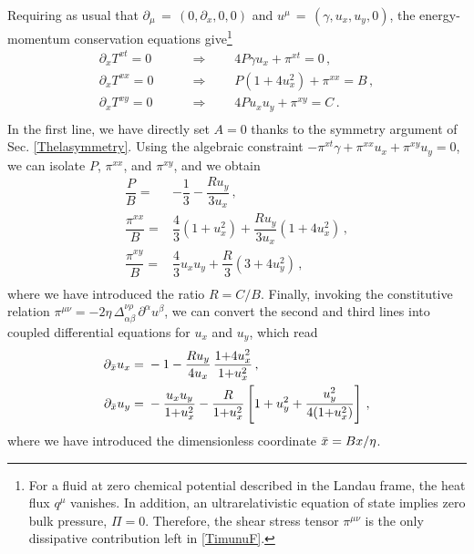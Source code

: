 \documentclass[a4paper, amsfonts, amssymb, amsmath, reprint, showkeys, nofootinbib, twoside,notitlepage,onecolumn]{revtex4-1}
\theoremstyle{definition}
\theoremstyle{theorem}
\begin{document}
Requiring as usual that $\partial_\mu\,{=}\,(0,\partial_x,0,0)$ and  $u^\mu\,{=}\,(\gamma,u_x,u_y,0)$, the energy-momentum conservation equations give\footnote{For a fluid at zero chemical potential described in the Landau frame, the heat flux $q^\mu$ vanishes. In addition, an ultrarelativistic equation of state implies zero bulk pressure, $\Pi=0$. Therefore, the shear stress tensor $\pi^{\mu\nu}$ is the only dissipative contribution left in \eqref{TimunuF}.}
\begin{equation}\label{ABCZeroChem}
\begin{split}
\partial_x T^{xt}=0 & \qquad \Longrightarrow \qquad 4P\gamma u_x +\pi^{xt}=0 \, , \\
\partial_x T^{xx}=0 & \qquad \Longrightarrow  \qquad P(1{+}4u_x^2)  +\pi^{xx}=B \, , \\
\partial_x T^{xy}=0 & \qquad \Longrightarrow \qquad  4Pu_x u_y +\pi^{xy}=C \, .\\
\end{split}
\end{equation}
In the first line, we have directly set $A=0$ thanks to the symmetry argument of Sec. \ref{Thelasymmetry}. Using the algebraic constraint $-\pi^{xt}\gamma+\pi^{xx}u_x+\pi^{xy}u_y=0$, we can isolate $P$, $\pi^{xx}$, and $\pi^{xy}$, and we obtain
\begin{equation}
\begin{split}
\dfrac{P}{B}={}& -\dfrac{1}{3}-\dfrac{Ru_y}{3u_x} \, , \\
\dfrac{\pi^{xx}}{B}={}& \dfrac{4}{3}(1{+}u_x^2) +\dfrac{R u_y}{3u_x} (1{+}4u_x^2) \, , \\
\dfrac{\pi^{xy}}{B}={}& \dfrac{4}{3} u_x u_y +\dfrac{R}{3} (3{+}4u_y^2)  \, , \\
\end{split}
\end{equation}
where we have introduced the ratio $R=C/B$. Finally, invoking the constitutive relation $\pi^{\mu\nu} = -2\eta\,\Delta^{\nu\rho}_{\alpha\beta}\,\partial^\alpha u^\beta$, we can convert the second and third lines into coupled differential equations for $u_x$ and $u_y$, which read
\begin{equation}\label{uxuyandsoon}
\begin{split}
\partial_{\Bar{x}} u_x ={}& -1-\dfrac{Ru_y}{4u_x}\, \dfrac{1{+}4u_x^2}{1{+}u_x^2} \, , \\
\partial_{\Bar{x}} u_y ={}& -\dfrac{u_x u_y}{1{+}u_x^2}-\dfrac{R}{1{+}u_x^2} \left[1+u_y^2 +\dfrac{u_y^2}{4(1{+}u_x^2)} \right] \, , \\
\end{split}
\end{equation}
where we have introduced the dimensionless coordinate $\Bar{x}=Bx/\eta$.
\end{document}

